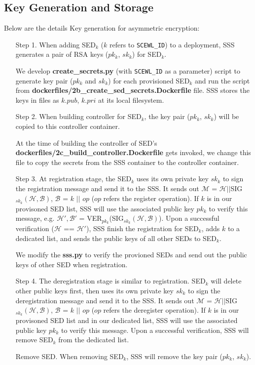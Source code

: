 \documentclass[11pt,oneside,onecolumn,letterpaper]{article}
\begin{document}
\subsection{Key Generation and Storage}

Below are the details Key generation for asymmetric encryption:
\begin{itemize}
  \item[Step 1.] When adding SED$_k$ ($k$ refers to \verb|SCEWL_ID|) to a deployment, SSS generates a pair of RSA keys ($pk_k$, $sk_k$) for SED$_k$.
  
  We develop \textbf{create\_secrets.py} (with \verb|SCEWL_ID| as a parameter) script to generate key pair ($pk_k$ and $sk_k$) for each provisioned SED$_k$ and run the script from  \textbf{dockerfiles/2b\_create\_sed\_secrets.Dockerfile} file.
  SSS stores the keys in files as $k.pub$, $k.pri$ at its local filesystem.

  \item[Step 2.] When building controller for SED$_k$, the key pair ($pk_k$, $sk_k$) will be copied to this controller container.
  
  At the time of building the controller of SED's \textbf{dockerfiles/2c\_build\_controller.Dockerfile}  gets invoked, we change this file to copy the secrets from the SSS container to the controller container.

  \item[Step 3.] At registration stage, the SED$_k$ uses its own private key $sk_k$ to sign the registration message and send it to the SSS.
  It sends out $\mathcal{M}$ = $\mathcal{H} || $SIG$_{sk_k}(\mathcal{H}, \mathcal{B})$, $\mathcal{B}$ = $k$ $||$ $op$ ($op$ refers the register operation).
  If $k$ is in our provisoned SED list, SSS will use the associated public key $pk_k$ to verify this message, e.g. $\mathcal{H'}, \mathcal{B'}$ = VER$_{pk_k}$(SIG$_{sk_k}(\mathcal{H}, \mathcal{B})$).
  Upon a successful verification ($\mathcal{H}$ == $\mathcal{H'}$), SSS finish the registration for SED$_k$, adds $k$ to a dedicated list, and sends the public keys of all other SEDs to SED$_k$.
  
  We modify the \textbf{sss.py} to verify the provioned SEDs and send out the public keys of other SED when registration.

  \item[Step 4.] The deregistration stage is similar to registration.
  SED$_k$ will delete other public keys first, then uses its own private key $sk_k$ to sign the deregistration message and send it to the SSS.
  It sends out $\mathcal{M}$ = $\mathcal{H} || $SIG$_{sk_k}(\mathcal{H}, \mathcal{B})$, $\mathcal{B}$ = $k$ $||$ $op$ ($op$ refers the deregister operation).
  If $k$ is in our provisoned SED list and in our dedicated list, SSS will use the associated public key $pk_k$ to verify this message.
  Upon a successful verification, SSS will remove SED$_k$ from the dedicated list.

  \item[Remove SED.] When removing SED$_k$, SSS will remove the key pair ($pk_k$, $sk_k$).
\end{itemize}
\end{document}
